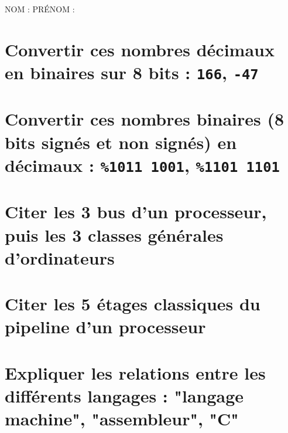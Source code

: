 \documentclass[11pt,a4paper]{article}
\author{Fabrice BOISSIER}
\begin{document}
\setlength{\fboxrule}{2pt}

\noindent {}

\bigskip

NOM : \hspace{6.5cm} PR\'ENOM :

\smallskip

\section{Convertir ces nombres décimaux en binaires sur 8 bits : \texttt{166}, \texttt{-47}}

\bigskip
\bigskip
\bigskip

\section{Convertir ces nombres binaires (8 bits signés et non signés) en décimaux : \texttt{\%1011 1001}, \texttt{\%1101 1101}}

\bigskip
\bigskip
\bigskip

\section{Citer les 3 bus d'un processeur, puis les 3 classes générales d'ordinateurs}

\bigskip
\bigskip
\bigskip
\bigskip
\bigskip

\section{Citer les 5 étages classiques du pipeline d'un processeur}

\bigskip
\bigskip
\bigskip

\section{Expliquer les relations entre les différents langages : "langage machine", "assembleur", "C"}
\end{document}
